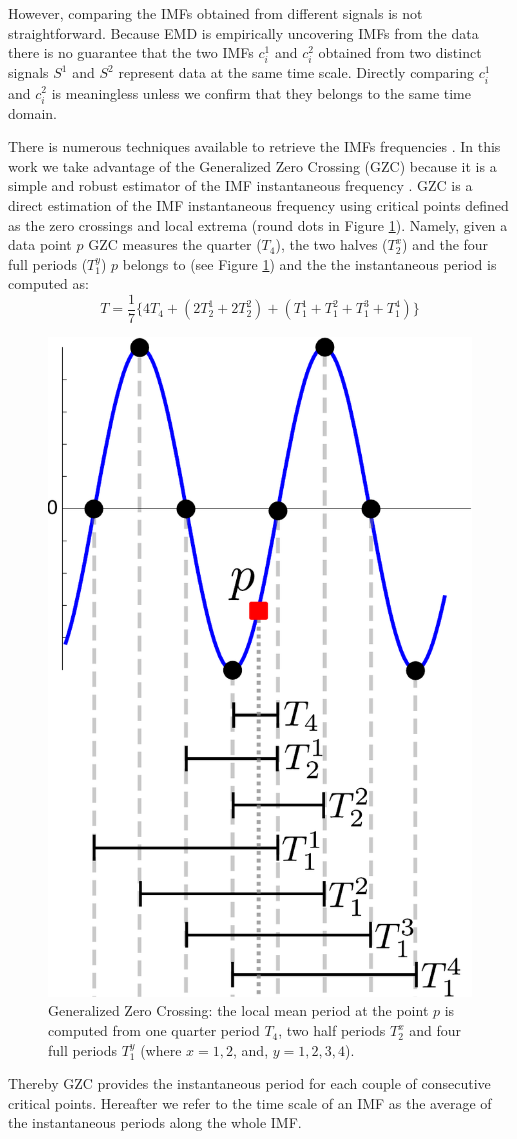 However, comparing the IMFs obtained from different signals is not straightforward.
Because EMD is empirically uncovering IMFs from the data there is no guarantee that the two IMFs $c_i^1$ and $c_i^2$ obtained from two distinct signals $S^1$ and $S^2$ represent data at the same time scale.
Directly comparing $c_i^1$ and $c_i^2$ is meaningless unless we confirm that they belongs to the same time domain.

There is numerous techniques available to retrieve the IMFs frequencies \cite{huang:aada2009}.
In this work we take advantage of the Generalized Zero Crossing (GZC) \cite{huang:patent2006} because it is a simple and robust estimator of the IMF instantaneous frequency \cite{huang:aada2009}.
GZC is a direct estimation of the IMF instantaneous frequency using critical points defined as the zero crossings and local extrema (round dots in Figure \ref{fig:gzc}).
Namely, given a data point $p$ GZC measures the quarter ($T_4$), the two halves ($T_2^x$) and the four full periods ($T_1^y$) $p$  belongs to (see Figure \ref{fig:gzc}) and the the instantaneous period is computed as:
\[T=\frac{1}{7}\{4T_4+(2T_2^1+2T_2^2)+(T_1^1+T_1^2+T_1^3+T_1^4)\}\]

\begin{figure}
\begin{center}
 \includegraphics[width=.3\textwidth]{img/gzc.pdf}
 \end{center}
 \caption{Generalized Zero Crossing: the local mean period at the point $p$ is computed from one quarter period $T_4$, two half periods $T_2^x$ and four full periods $T_1^y$ (where $x=1, 2$, and, $y=1,2,3,4$).}
 \label{fig:gzc}
\end{figure}

Thereby GZC provides the instantaneous period for each couple of consecutive critical points.
Hereafter we refer to the time scale of an IMF as the average of the instantaneous periods along the whole IMF.

